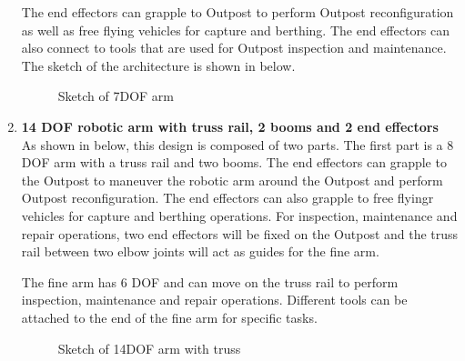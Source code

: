 \begin{enumerate}
{The end effectors can grapple to Outpost to perform Outpost reconfiguration as well as free flying vehicles for capture and berthing. The end effectors can also connect to tools that are used for Outpost inspection and maintenance. The sketch of the architecture is shown in  below.
\begin{figure}[H]
\centering
\caption{Sketch of 7DOF arm}
\label{fig:7dof}
\end{figure}
}
\item{\textbf{14 DOF robotic arm with truss rail, 2 booms and 2 end effectors}\\
As shown in  below, this design is composed of two parts. The first part is a 8 DOF arm with a truss rail and two booms. The end effectors can grapple to the Outpost to maneuver the robotic arm around the Outpost and perform Outpost reconfiguration. The end effectors can also grapple to free flyingr vehicles for capture and berthing operations. For inspection, maintenance and repair operations, two end effectors will be fixed on the Outpost and the truss rail between two elbow joints will act as guides for the fine arm.

The fine arm has 6 DOF and can move on the truss rail to perform inspection, maintenance and repair operations. Different tools can be attached to the end of the fine arm for specific tasks.
\begin{figure}[H]
\centering
\caption{Sketch of 14DOF arm with truss}
\label{fig:14dof_truss}
\end{figure}
}
\end{enumerate}

